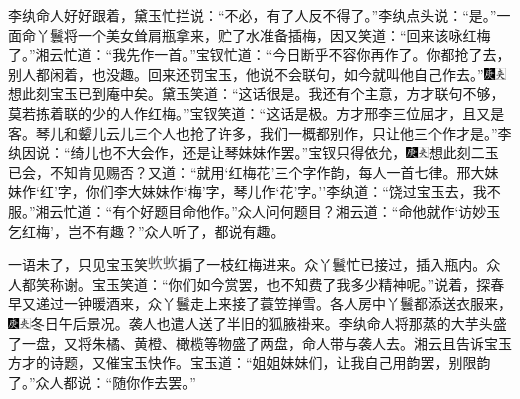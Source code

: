 李纨命人好好跟着，黛玉忙拦说：``不必，有了人反不得了。''李纨点头说：``是。''一面命丫鬟将一个美女耸肩瓶拿来，贮了水准备插梅，因又笑道：``回来该咏红梅了。''湘云忙道：``我先作一首。''宝钗忙道：``今日断乎不容你再作了。你都抢了去，别人都闲着，也没趣。回来还罚宝玉，他说不会联句，如今就叫他自己作去。''{\includegraphics[width=3mm]{../Images/00004}\includegraphics[width=3mm]{../Images/00012}\footnotesize \kaishu 想此刻宝玉已到庵中矣。}黛玉笑道：``这话很是。我还有个主意，方才联句不够，莫若拣着联的少的人作红梅。''宝钗笑道：``这话是极。方才邢李三位屈才，且又是客。琴儿和颦儿云儿三个人也抢了许多，我们一概都别作，只让他三个作才是。''李纨因说：``绮儿也不大会作，还是让琴妹妹作罢。''宝钗只得依允，{\includegraphics[width=3mm]{../Images/00004}\includegraphics[width=3mm]{../Images/00012}\footnotesize \kaishu 想此刻二玉已会，不知肯见赐否？}又道：``就用`红梅花'三个字作韵，每人一首七律。邢大妹妹作`红'字，你们李大妹妹作`梅'字，琴儿作`花'字。''李纨道：``饶过宝玉去，我不服。''湘云忙道：``有个好题目命他作。''众人问何题目？湘云道：``命他就作`访妙玉乞红梅'，岂不有趣？''众人听了，都说有趣。

一语未了，只见宝玉笑\includegraphics[width=4mm]{../images/00025}\includegraphics[width=4mm]{../images/00025}掮了一枝红梅进来。众丫鬟忙已接过，插入瓶内。众人都笑称谢。宝玉笑道：``你们如今赏罢，也不知费了我多少精神呢。''说着，探春早又递过一钟暖酒来，众丫鬟走上来接了蓑笠掸雪。各人房中丫鬟都添送衣服来，{\includegraphics[width=3mm]{../Images/00004}\includegraphics[width=3mm]{../Images/00012}\footnotesize \kaishu 冬日午后景况。}袭人也遣人送了半旧的狐腋褂来。李纨命人将那蒸的大芋头盛了一盘，又将朱橘、黄橙、橄榄等物盛了两盘，命人带与袭人去。湘云且告诉宝玉方才的诗题，又催宝玉快作。宝玉道：``姐姐妹妹们，让我自己用韵罢，别限韵了。''众人都说：``随你作去罢。''

